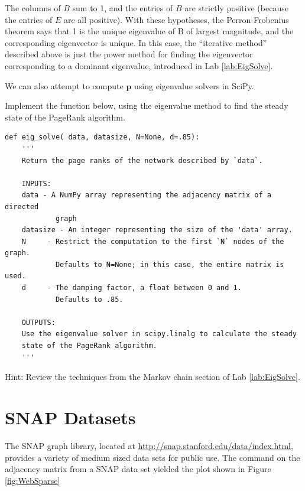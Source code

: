 The columns of $B$ sum to 1, and the entries of $B$ are strictly positive (because the entries of $E$ are all positive).
With these hypotheses, the Perron-Frobenius theorem says that 1 is the unique eigenvalue of B of largest magnitude, and the corresponding eigenvector is unique.
In this case, the ``iterative method'' described above is just the power method for finding the eigenvector corresponding to a dominant eigenvalue, introduced in Lab \ref{lab:EigSolve}.

We can also attempt to compute $\mathbf{p}$ using eigenvalue solvers in SciPy.

\begin{problem}
Implement the function below, using the eigenvalue method to find the steady state of the PageRank algorithm.
\begin{lstlisting}
def eig_solve( data, datasize, N=None, d=.85):
    '''
    Return the page ranks of the network described by `data`.
    
    INPUTS:
    data - A NumPy array representing the adjacency matrix of a directed 
            graph
    datasize - An integer representing the size of the 'data' array.
    N     - Restrict the computation to the first `N` nodes of the graph. 
            Defaults to N=None; in this case, the entire matrix is used.
    d     - The damping factor, a float between 0 and 1. 
            Defaults to .85.
    
    OUTPUTS:
    Use the eigenvalue solver in scipy.linalg to calculate the steady 
    state of the PageRank algorithm.
    '''
\end{lstlisting}
Hint: Review the techniques from the Markov chain section of Lab \ref{lab:EigSolve}.
\end{problem}


\section*{SNAP Datasets}
The SNAP graph library, located at \url{http://snap.stanford.edu/data/index.html}, provides a variety of medium sized data sets for public use.
The  command on the adjacency matrix from a SNAP data set yielded the plot shown in Figure \ref{fig:WebSparse}


